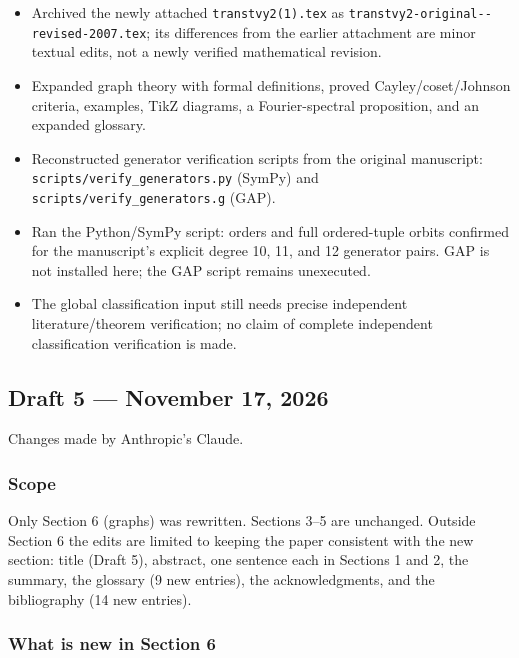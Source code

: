 \documentclass[12pt,letterpaper]{article}
\providecommand{\tightlist}{\setlength{\itemsep}{0pt}\setlength{\parskip}{0pt}}
\begin{document}
\begin{itemize}
\tightlist
\item
  Archived the newly attached \texttt{transtvy2(1).tex} as
  \texttt{transtvy2-\allowbreak original--\allowbreak revised-\allowbreak 2007.tex}; its differences
  from the earlier attachment are minor textual edits, not a newly
  verified mathematical revision.
\item
  Expanded graph theory with formal definitions, proved
  Cayley/coset/Johnson criteria, examples, TikZ diagrams, a
  Fourier-spectral proposition, and an expanded glossary.
\item
  Reconstructed generator verification scripts from the original
  manuscript: \texttt{scripts/\allowbreak verify\_\allowbreak generators.py} (SymPy) and
  \texttt{scripts/\allowbreak verify\_\allowbreak generators.g} (GAP).
\item
  Ran the Python/SymPy script: orders and full ordered-tuple orbits
  confirmed for the manuscript's explicit degree 10, 11, and 12
  generator pairs. GAP is not installed here; the GAP script remains
  unexecuted.
\item
  The global classification input still needs precise independent
  literature/theorem verification; no claim of complete independent
  classification verification is made.
\end{itemize}

\hypertarget{draft-5-november-17-2026}{%
\subsection*{Draft 5 --- November 17,
2026}\label{draft-5-november-17-2026}}

Changes made by Anthropic's Claude.

\hypertarget{scope}{%
\subsubsection*{Scope}\label{scope}}

Only Section 6 (graphs) was rewritten. Sections 3--5 are unchanged.
Outside Section 6 the edits are limited to keeping the paper consistent
with the new section: title (Draft 5), abstract, one sentence each in
Sections 1 and 2, the summary, the glossary (9 new entries), the
acknowledgments, and the bibliography (14 new entries).

\hypertarget{what-is-new-in-section-6}{%
\subsubsection*{What is new in Section
6}\label{what-is-new-in-section-6}}
\end{document}
